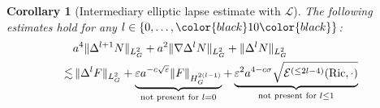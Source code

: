 \documentclass[11pt,leqno,textwidth=10cm]{amsart}
\numberwithin{equation}{section}
\theoremstyle{definition}
\theoremstyle{plain}
\newtheorem{corollary}[definition]{Corollary}
\newcommand{\1}{\mathbbm{1}}
\newcommand{\E}{\mathcal{E}}
\renewcommand{\L}{\mathcal{L}}
\newcommand{\Ric}{\text{\normalfont{Ric}}}
\renewcommand{\epsilon}{\varepsilon}
\newcommand{\Lap}{\Delta}
\newcommand{\change}[1]{\color{black}#1\color{black}}
\begin{document}
\begin{corollary}[Intermediary elliptic lapse estimate with $\L$]\label{cor:ell-lapse-L}
The following estimates hold for any $l\in\{0,\dots,\change{10}\}$:
\begin{align*}
&a^4\|\Lap^{l+1} N\|_{L^2_G}+a^2\|\nabla\Lap^l N\|_{L^2_G}+\|\Lap^lN\|_{L^2_G}\\
\lesssim&\,\|\Lap^lF\|_{L^2_G}+\underbrace{\epsilon a^{-c\sqrt{\epsilon}}\|F\|_{H^{2(l-1)}_G}}_{\text{not present for }l=0}+\underbrace{\epsilon^2a^{4-c\sigma}\sqrt{\E^{(\leq 2l-4)}(\Ric,\cdot)}}_{\text{not present for }l\leq 1}\\
\end{align*}
\end{corollary}
\end{document}
